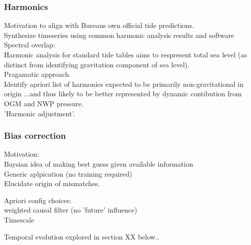 \documentclass[jmse,article,submit,moreauthors,pdftex,10pt,a4paper]{mdpi}
\begin{document}
\subsubsection{Harmonics}
Motivation to align with Bureaus own official tide predictions.\\
Synthesize timeseries using common harmonic analysis results and software\\

Spectral overlap:\\
Harmonic analysis for standard tide tables aims to respresent total sea level (as distinct from identifying gravitation component of sea level).\\
Pragamatic approach\\
Identify apriori list of harmonics expected to be primarily non-gravitational in origin ...and thus likely to be better represented by dynamic contibution from OGM and NWP pressure.\\
'Harmonic  adjustment'.




\subsubsection{Bias correction}
Motivation:\\
Baysian idea of making best guess given available information\\
Generic aplpication (no training required)\\
Elucidate origin of mismatches.


Apriori config choices:\\
weighted causal filter (no 'future' influence)\\
Timescale 
 

Temporal evolution explored in section XX below..
  


\end{document}
